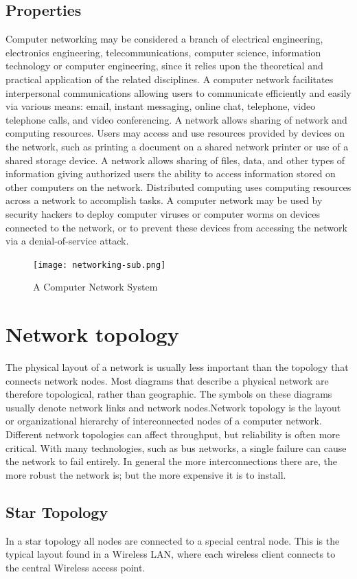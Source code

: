 \documentclass{article}
\begin{document}
\subsection{Properties}
Computer networking may be considered a branch of electrical engineering, electronics engineering, telecommunications, computer science, information technology or computer engineering, since it relies upon the theoretical and practical application of the related disciplines.
A computer network facilitates interpersonal communications allowing users to communicate efficiently and easily via various means: email, instant messaging, online chat, telephone, video telephone calls, and video conferencing. A network allows sharing of network and computing resources. Users may access and use resources provided by devices on the network, such as printing a document on a shared network printer or use of a shared storage device. A network allows sharing of files, data, and other types of information giving authorized users the ability to access information stored on other computers on the network. Distributed computing uses computing resources across a network to accomplish tasks.
A computer network may be used by security hackers to deploy computer viruses or computer worms on devices connected to the network, or to prevent these devices from accessing the network via a denial-of-service attack.
\begin{figure}[h]
\texttt{[image: networking-sub.png]}
\caption*{A Computer Network System}
\end{figure}
\newpage
\section{Network topology}
The physical layout of a network is usually less important than the topology that connects network nodes. Most diagrams that describe a physical network are therefore topological, rather than geographic. The symbols on these diagrams usually denote network links and network nodes.Network topology is the layout or organizational hierarchy of interconnected nodes of a computer network. Different network topologies can affect throughput, but reliability is often more critical. With many technologies, such as bus networks, a single failure can cause the network to fail entirely. In general the more interconnections there are, the more robust the network is; but the more expensive it is to install.
\subsection{Star Topology}
In a star topology all nodes are connected to a special central node. This is the typical layout found in a Wireless LAN, where each wireless client connects to the central Wireless access point.\\
\end{document}
